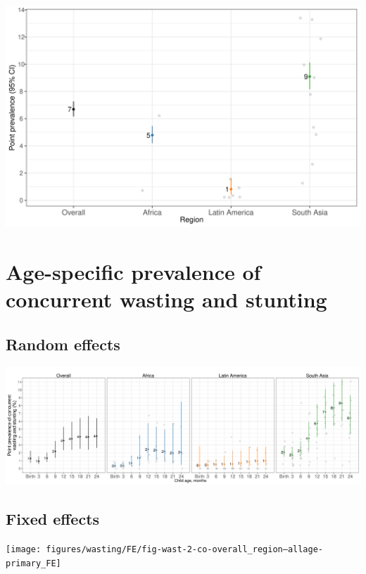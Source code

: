 \documentclass[
  9pt,
]{book}
\begin{document}
\includegraphics[width=33.33in]{figures/wasting/pooled_pers024_FE}

\hypertarget{age-specific-prevalence-of-concurrent-wasting-and-stunting}{%
\section{Age-specific prevalence of concurrent wasting and stunting}\label{age-specific-prevalence-of-concurrent-wasting-and-stunting}}

\hypertarget{random-effects-6}{%
\subsection{Random effects}\label{random-effects-6}}

\includegraphics[width=62.5in]{figures/wasting/fig-wast-2-co-overall_region--allage-primary}

\hypertarget{fixed-effects-7}{%
\subsection{Fixed effects}\label{fixed-effects-7}}

\texttt{[image: figures/wasting/FE/fig-wast-2-co-overall\_region--allage-primary\_FE]}
\end{document}
